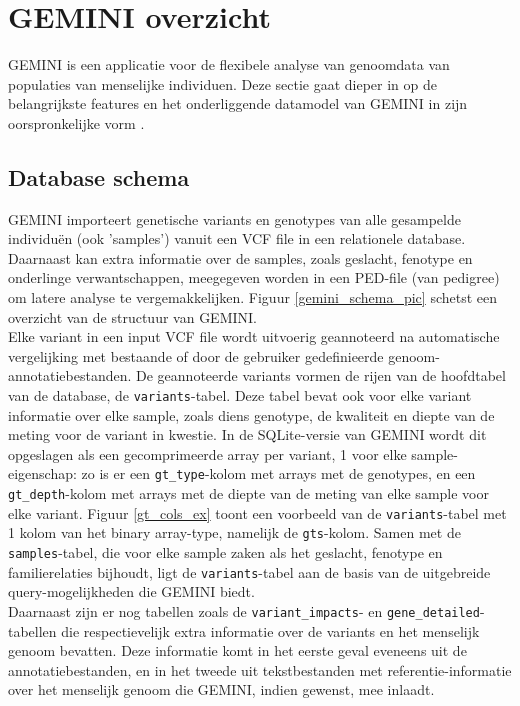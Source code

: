 \chapter{GEMINI overzicht}
\label{gemini_beschrijving}

GEMINI is een applicatie voor de flexibele analyse van genoomdata van populaties van menselijke individuen. Deze sectie gaat dieper in op de belangrijkste features en het onderliggende datamodel van GEMINI in zijn oorspronkelijke vorm \cite{10.1371/journal.pcbi.1003153}\cite{gemini_docs}.

\section{Database schema}

GEMINI importeert genetische variants en genotypes van alle gesampelde individu\"en (ook 'samples') vanuit een VCF file in een relationele database.
Daarnaast kan extra informatie over de samples, zoals geslacht, fenotype en onderlinge verwantschappen, meegegeven worden in een PED-file (van pedigree) om latere analyse te vergemakkelijken. Figuur \ref{gemini_schema_pic} schetst een overzicht van de structuur van GEMINI.\\

Elke variant in een input VCF file wordt uitvoerig geannoteerd na automatische vergelijking met bestaande of door de gebruiker gedefinieerde genoom-annotatiebestanden. De geannoteerde variants vormen de rijen van de hoofdtabel van de database, de \texttt{variants}-tabel. Deze tabel bevat ook voor elke variant informatie over elke sample, zoals diens genotype, de kwaliteit en diepte van de meting voor de variant in kwestie. In de SQLite-versie van GEMINI wordt dit opgeslagen als een gecomprimeerde array per variant, 1 voor elke sample-eigenschap: zo is er een \texttt{gt\_type}-kolom met arrays met de genotypes, en een \texttt{gt\_depth}-kolom met arrays met de diepte van de meting van elke sample voor elke variant. Figuur \ref{gt_cols_ex} toont een voorbeeld van de \texttt{variants}-tabel met 1 kolom van het binary array-type, namelijk de \texttt{gts}-kolom. Samen met de \texttt{samples}-tabel, die voor elke sample zaken als het geslacht, fenotype en familierelaties bijhoudt, ligt de \texttt{variants}-tabel aan de basis van de uitgebreide query-mogelijkheden die GEMINI biedt.\\
Daarnaast zijn er nog tabellen zoals de \texttt{variant\_impacts}- en \texttt{gene\_detailed}-tabellen die respectievelijk extra informatie over de variants en het menselijk genoom bevatten. Deze informatie komt in het eerste geval eveneens uit de annotatiebestanden, en in het tweede uit tekstbestanden met referentie-informatie over het menselijk genoom die GEMINI, indien gewenst, mee inlaadt.\\

